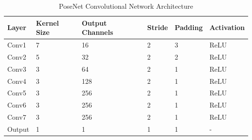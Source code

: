 \begin{table}[h]

    \caption{PoseNet Convolutional Network Architecture}
    \centering
    \begin{tabular}{@{}llllll@{}}
        \toprule
        Layer               & Kernel Size   & Output Channels   & Stride    & Padding   & Activation\\ 
        \midrule
        Conv1               & 7             & 16                & 2         & 3         & ReLU      \\ 
        Conv2               & 5             & 32                & 2         & 2         & ReLU      \\ 
        Conv3               & 3             & 64                & 2         & 1         & ReLU      \\ 
        Conv4               & 3             & 128               & 2         & 1         & ReLU      \\
        Conv5               & 3             & 256               & 2         & 1         & ReLU      \\
        Conv6               & 3             & 256               & 2         & 1         & ReLU      \\
        Conv7               & 3             & 256               & 2         & 1         & ReLU      \\
        Output              & 1             & 1                 & 1         & 1         & -         \\ 
        \bottomrule
    \end{tabular}
    \label{posenet-layers}
\end{table}

